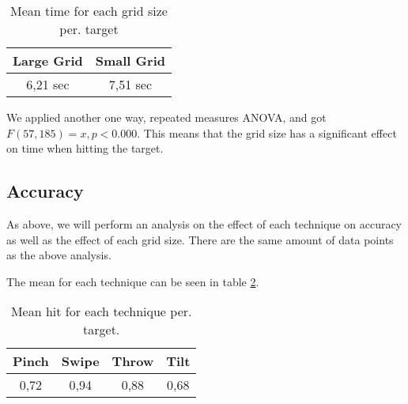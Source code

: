 \begin{table}[]
	\centering
	\begin{tabular}{cc}
		\hline
		\rowcolor[HTML]{9B9B9B} 
		\textbf{Large Grid} & \textbf{Small Grid} \\ \hline
		6,21 sec & 7,51 sec \\ \hline
	\end{tabular}
	\caption{Mean time for each grid size per. target}
	\label{fig:meanTimesSize}
\end{table}

We applied another one way, repeated measures ANOVA, and got $F(57,185) = x, p<0.000$. This means that the grid size has a significant effect on time when hitting the target. 

\subsection{Accuracy}

As above, we will perform an analysis on the effect of each technique on accuracy as well as the effect of each grid size. There are the same amount of data points as the above analysis. 

The mean for each technique can be seen in table \ref{tab:meanHitTechnique}. 

\begin{table}[]
	\centering
	\label{tab:meanHitTechnique}
	\begin{tabular}{|c|c|c|c|}
		\hline
		\rowcolor[HTML]{9B9B9B} 
		\textbf{Pinch} & \textbf{Swipe} & \textbf{Throw} & \textbf{Tilt} \\ \hline
		0,72          & 0,94          & 0,88          & 0,68         \\ \hline
	\end{tabular}
	\caption{Mean hit for each technique per. target.}
\end{table}